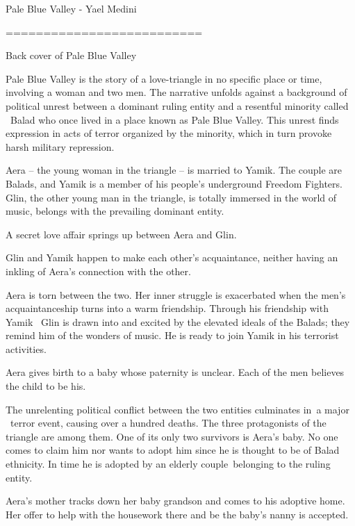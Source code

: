 \documentclass[letterpaper]{article}
\title{}
\author{[5D9?][5E2?][5DC?]}
\date{2020-07-20}
\begin{document}
\clearpage\setcounter{page}{1}\pagestyle{Standard}

\bigskip

Pale Blue Valley - Yael Medini 

==========================


\bigskip


\bigskip

{Back cover of Pale Blue Valley}


\bigskip

{Pale Blue Valley is the story of a love-triangle in no specific place
or time, involving a woman and two men. The narrative unfolds against a background of political unrest between a
dominant ruling entity and a resentful minority called \ Balad who once lived in a place known as Pale Blue Valley.
This unrest finds expression in acts of terror organized by the minority, which in turn provoke harsh military
repression.}

{Aera -- the young woman in the triangle -- is married to Yamik. The
couple are Balads, and Yamik is a member of his people's underground Freedom Fighters. Glin, the other young man in the
triangle, is totally immersed in the world of music, belongs with the prevailing dominant entity. \ }

{A secret love affair springs up between Aera and Glin. \ }

{Glin and Yamik happen to make each other's acquaintance, neither
having an inkling of Aera's connection with the other.}

{Aera is torn between the two. Her inner struggle is exacerbated when
the men's acquaintanceship turns into a warm friendship. Through his friendship with Yamik \ Glin is drawn into and
excited by the elevated ideals of the Balads; they remind him of the wonders of music. He is ready to join Yamik in his
terrorist activities.}

{Aera gives birth to a baby whose paternity is unclear. Each of the men
believes the child to be his.}

{The unrelenting political conflict between the two entities culminates
in~a major \ terror event, causing over a hundred deaths. The three protagonists of the
{\textquotedbl}triangle{\textquotedbl} are among them. One of its only two survivors is Aera's baby. No one comes to
claim him nor wants to adopt him since he is thought to be of Balad ethnicity. In time he is adopted by an elderly
couple~belonging to the ruling entity. }

{Aera's mother tracks down her baby grandson and comes to his adoptive
home. Her offer to help with the housework there and be the baby's nanny is accepted. }
\end{document}
